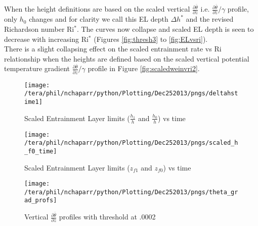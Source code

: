 When the height definitions are based on the scaled vertical $\frac{\partial \overline{\theta}}{\partial z}$
i.e. $\frac{\partial \overline{\theta}}{\partial z} / \gamma$ profile, only $h_{0}$ changes and for clarity we 
call this \acs{EL} depth $\Delta h^{*}$ and the revised Richardson number Ri$^{*}$.   The curves now collapse and 
scaled \acs{EL} depth is seen to decrease with increasing \acs{Ri}$^{*}$ (Figures \ref{fig:thresh3} to \ref{fig:ELvsri}).\\

There is a slight collapsing effect on the scaled entrainment rate vs \acs{Ri} relationship when
the heights are defined based on the scaled vertical potential temperature gradient 
$\frac{\partial \overline{\theta}}{\partial z} / \gamma$ profile in Figure \ref{fig:scaledweinvri2}.\\

\begin{figure}[htbp]
    \centering
    \texttt{[image: /tera/phil/nchaparr/python/Plotting/Dec252013/pngs/deltahstime1]}
    \caption{Scaled Entrainment Layer limits ($\frac{h_{1}}{h}$ and $\frac{h_{0}}{h}$) vs time}
    \label{fig:scaledELlims}   %
\end{figure}

\begin{figure}[htbp]
    \centering
    \texttt{[image: /tera/phil/nchaparr/python/Plotting/Dec252013/pngs/scaled\_h\_f0\_time]}
    \caption{Scaled Entrainment Layer limits ($z_{f1}$ and $z_{f0}$) vs time}
    \label{fig:scaledELlims1}   %
\end{figure}

\begin{figure}[htbp]
    \centering
    \texttt{[image: /tera/phil/nchaparr/python/Plotting/Dec252013/pngs/theta\_grad\_profs]}
    \caption{Vertical $\frac{\partial \overline{\theta}}{\partial z}$ profiles with threshold at .0002}
    \label{fig:thresh}   %
\end{figure}

